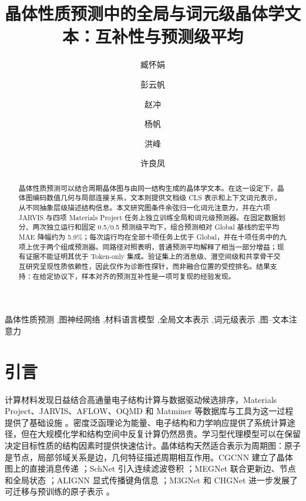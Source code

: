 \documentclass[a4paper,fleqn]{cas-sc}
\begin{document}
\let\WriteBookmarks\relax
{}
\title[mode=title]{晶体性质预测中的全局与词元级晶体学文本：互补性与预测级平均}
\author[1]{臧怀娟}
\author[1]{彭云帆}\cormark[1]
\author[2]{赵冲}
\author[1]{杨帆}
\author[3]{洪峰}
\author[1]{许良凤}

\begin{abstract}
晶体性质预测可以结合周期晶体图与由同一结构生成的晶体学文本。在这一设定下，晶体图编码数值几何与局部连接关系，文本则提供文档级 CLS 表示和上下文词元表示，从不同抽象层级描述结构信息。本文研究图条件余弦归一化词元注意力，并在六项 JARVIS 与四项 Materials Project 任务上独立训练全局和词元级预测器。在固定数据划分、两次独立运行和固定 0.5/0.5 预测级平均下，组合预测相对 Global 基线的宏平均 MAE 降幅约为 5.9\%；每次运行均在全部十项任务上优于 Global，并在十项任务中的九项上优于两个组成预测器。同路径对照表明，普通预测平均解释了相当一部分增益；现有证据不能证明其优于 Token-only 集成。验证集上的消息级、潜空间级和共享骨干交互研究呈现性质依赖性，因此仅作为诊断性探针，而非融合位置的受控排名。结果支持：在给定协议下，样本对齐的预测互补性是一项可复现的经验发现。
\end{abstract}
\begin{keywords}晶体性质预测 \sep 图神经网络 \sep 材料语言模型 \sep 全局文本表示 \sep 词元级表示 \sep 图--文本注意力\end{keywords}
\maketitle

\section{引言}
计算材料发现日益结合高通量电子结构计算与数据驱动候选排序，Materials Project、JARVIS、AFLOW、OQMD 和 Matminer 等数据库与工具为这一过程提供了基础设施 \citep{jain2013materialsproject,choudhary2020jarvis,curtarolo2012aflow,saal2013oqmd,ward2018matminer}。密度泛函理论为能量、电子结构和力学响应提供了系统计算途径，但在大规模化学和结构空间中反复计算仍然昂贵。学习型代理模型可以在保留决定目标性质的结构因素时提供快速估计。晶体结构天然适合表示为周期图：原子是节点，局部邻域关系是边，几何特征描述周期相互作用。CGCNN 建立了晶体图上的直接消息传递 \citep{xie2018cgcnn}；SchNet 引入连续滤波卷积 \citep{schutt2018schnet}；MEGNet 联合更新边、节点和全局状态 \citep{chen2019megnet}；ALIGNN 显式传播键角信息 \citep{choudhary2021alignn}；M3GNet 和 CHGNet 进一步发展了可迁移与预训练的原子表示 \citep{chen2022m3gnet,deng2023chgnet}。
\end{document}
